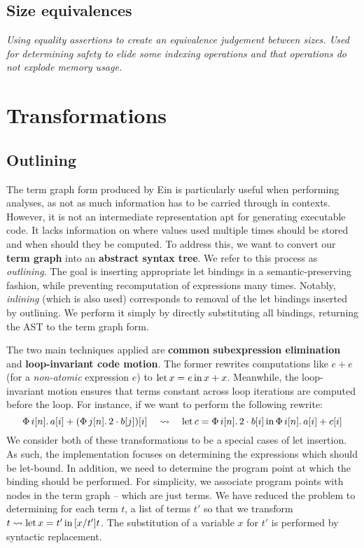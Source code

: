 \todothis

\subsection{Size equivalences}

\textit{Using equality assertions to create an equivalence judgement between sizes. Used for determining safety to elide some indexing operations and that operations do not explode memory usage.} \todothis 


\section{Transformations}
\label{compiler-transformations}

\subsection{Outlining}

The term graph form produced by Ein is particularly useful when performing analyses, as not as much information has to be carried through in contexts. However, it is not an intermediate representation apt for generating executable code. It lacks information on where values used multiple times should be stored and when should they be computed. To address this, we want to convert our \textbf{term graph} into an \textbf{abstract syntax tree}. We refer to this process as \textit{outlining}. The goal is inserting appropriate let bindings in a semantic-preserving fashion, while preventing recomputation of expressions many times. Notably, \textit{inlining} (which is also used) corresponds to removal of the let bindings inserted by outlining. We perform it simply by directly substituting all bindings, returning the AST to the term graph form.

The two main techniques applied are \textbf{common subexpression elimination} and \textbf{loop-invariant code motion}. The former rewrites computations like $e + e$ (for a \textit{non-atomic} expression $e$) to  $\mathrm{let}\,{x}={e}\,\mathrm{in}\,{x + x}$. Meanwhile, the loop-invariant motion ensures that terms constant across loop iterations are computed before the loop. For instance, if we want to perform the following rewrite:
$$ 
\phivec{i}{n}{a[i] + \left( \phivec{j}{n}{2 \cdot b[j]} \right)[i]} \quad\leadsto\quad \philet{c}{\phivec{i}{n}{2 \cdot b[i]}}{\phivec{i}{n}{a[i] + c[i]}} 
$$
We consider both of these transformations to be a special cases of let insertion. As such, the implementation focuses on determining the expressions which should be let-bound. In addition, we need to determine the program point at which the binding should be performed. For simplicity, we associate program points with nodes in the term graph -- which are just terms. We have reduced the problem to determining for each term $t$, a list of terms $t'$ so that we transform $t \leadsto \mathrm{let}\,{x}={t'}\,\mathrm{in}\,{[x/t']t}$. The substitution of a variable $x$ for $t'$ is performed by syntactic replacement.

